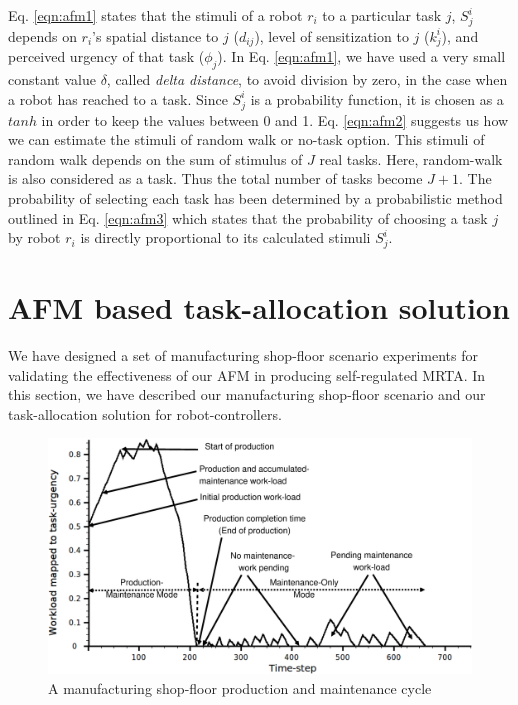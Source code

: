 \documentclass[final,5p,times,twocolumn]{elsarticle}
\begin{document}
Eq. \ref{eqn:afm1} states that the stimuli of a robot $r_i$ to a particular task $j$, $S^{i}_{j}$ depends on $r_i$'s spatial distance to $j$ ($d_{ij}$), level of sensitization to $j$ ($k_{j}^{i}$), and perceived urgency of that task ($\phi _{j}$). In  Eq. \ref{eqn:afm1}, we have used a very small constant value $\delta$, called {\em delta distance}, to avoid division by zero, in the case when a robot has reached to a task. Since $S^{i}_{j}$ is a probability function, it is chosen as a $tanh$ in order to keep the values between 0 and 1. Eq. \ref{eqn:afm2} suggests us how we can estimate the stimuli of random walk or no-task option. This stimuli of random walk depends on the sum of stimulus of $J$ real tasks. Here, random-walk is also considered as a task. Thus the total number of tasks become $J+1$. The probability of selecting each task has been determined by a probabilistic method outlined in Eq. \ref{eqn:afm3} which states that the probability of choosing a task $j$ by robot $r_i$ is directly proportional to its calculated stimuli $ S^i_j$. 
\section{AFM based task-allocation solution}
\label{sec:mrta}
We have designed a set of  manufacturing shop-floor scenario experiments for validating the effectiveness of our AFM in producing self-regulated MRTA.  In this section, we have described our manufacturing shop-floor scenario and our task-allocation solution for robot-controllers.
\begin{figure}
\centering
\includegraphics[width=0.7\linewidth, angle=0]
{./images/VSP.eps}
\caption{A manufacturing shop-floor production and maintenance cycle}
\label{fig:vsp}  %
\end{figure}
\end{document}

